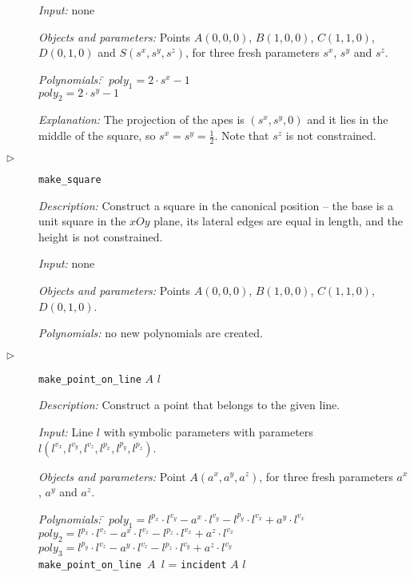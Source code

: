 \documentclass{aicom2e}
\begin{document}
\begin{description}
  {\em Input:} none

  {\em Objects and parameters:} Points $A(0, 0, 0)$, $B(1, 0, 0)$,
  $C(1, 1, 0)$, $D(0, 1, 0)$ and $S(s^x, s^y, s^z)$, for three fresh
  parameters $s^x$, $s^y$ and $s^z$.
\begin{tabbing}
{\em Polynomials:} \= $poly_1 = 2\cdot s^x - 1$ \\
                   \> $poly_2 = 2\cdot s^y - 1$
\end{tabbing}

{\em Explanation:} The projection of the apes is $(s^x, s^y, 0)$ and
it lies in the middle of the square, so $s^x = s^y =
\frac{1}{2}$. Note that $s^z$ is not constrained.

\item[$\triangleright$] {\tt make\_square}

  {\em Description:} Construct a square in the canonical position --
  the base is a unit square in the $xOy$ plane, its lateral edges are
  equal in length, and the height is not constrained.
  
  {\em Input:} none

  {\em Objects and parameters:} Points $A(0, 0, 0)$, $B(1, 0, 0)$,
  $C(1, 1, 0)$, $D(0, 1, 0)$.

\begin{tabbing}
{\em Polynomials:} no new polynomials are created.
\end{tabbing}

\item[$\triangleright$] {\tt make\_point\_on\_line} $A$ $l$

  {\em Description:} Construct a point that belongs to the given line.
  
  {\em Input:} Line $l$ with symbolic parameters with parameters
  $l(l^{v_x}, l^{v_y}, l^{v_z}, l^{p_x}, l^{p_y}, l^{p_z})$.

  {\em Objects and parameters:} Point $A(a^x, a^y, a^z)$, for three
  fresh parameters $a^x$, $a^y$ and $a^z$.

\begin{tabbing}
{\em Polynomials:} \= $poly_1 = l^{p_x}\cdot l^{v_y} - a^x\cdot l^{v_y} - l^{p_y}\cdot l^{v_x} + a^y\cdot l^{v_x}$ \\
                   \> $poly_2 = l^{p_x}\cdot l^{v_z} - a^x\cdot l^{v_z} - l^{p_z}\cdot l^{v_x} + a^z\cdot l^{v_x}$ \\
                   \> $poly_3 = l^{p_y}\cdot l^{v_z} - a^y\cdot l^{v_z} - l^{p_z}\cdot l^{v_y} + a^z\cdot l^{v_y}$ \\
                   \> {\tt make\_point\_on\_line $A$ $l$} = {\tt incident} $A$ $l$
\end{tabbing}


\end{description}
\end{document}
